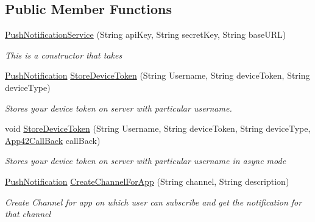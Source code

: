 \subsection*{Public Member Functions}
\begin{DoxyCompactItemize}
\item 
\hyperlink{classcom_1_1shephertz_1_1app42_1_1paas_1_1sdk_1_1csharp_1_1push_notification_1_1_push_notification_service_a5db0830a018bde1d786e00ac381d0fc8}{Push\+Notification\+Service} (String api\+Key, String secret\+Key, String base\+U\+R\+L)
\begin{DoxyCompactList}\small\item\em This is a constructor that takes \end{DoxyCompactList}\item 
\hyperlink{classcom_1_1shephertz_1_1app42_1_1paas_1_1sdk_1_1csharp_1_1push_notification_1_1_push_notification}{Push\+Notification} \hyperlink{classcom_1_1shephertz_1_1app42_1_1paas_1_1sdk_1_1csharp_1_1push_notification_1_1_push_notification_service_a87e90c3aacce141546c64b2196bafdf3}{Store\+Device\+Token} (String Username, String device\+Token, String device\+Type)
\begin{DoxyCompactList}\small\item\em Stores your device token on server with particular username. \end{DoxyCompactList}\item 
void \hyperlink{classcom_1_1shephertz_1_1app42_1_1paas_1_1sdk_1_1csharp_1_1push_notification_1_1_push_notification_service_a05fc8805d6444b133b2f438b0f2f148b}{Store\+Device\+Token} (String Username, String device\+Token, String device\+Type, \hyperlink{interfacecom_1_1shephertz_1_1app42_1_1paas_1_1sdk_1_1csharp_1_1_app42_call_back}{App42\+Call\+Back} call\+Back)
\begin{DoxyCompactList}\small\item\em Stores your device token on server with particular username in async mode \end{DoxyCompactList}\item 
\hyperlink{classcom_1_1shephertz_1_1app42_1_1paas_1_1sdk_1_1csharp_1_1push_notification_1_1_push_notification}{Push\+Notification} \hyperlink{classcom_1_1shephertz_1_1app42_1_1paas_1_1sdk_1_1csharp_1_1push_notification_1_1_push_notification_service_ac4c152f02c8cb52265bb0be96245b4d9}{Create\+Channel\+For\+App} (String channel, String description)
\begin{DoxyCompactList}\small\item\em Create Channel for app on which user can subscribe and get the notification for that channel \end{DoxyCompactList}\item 

\end{DoxyCompactItemize}
